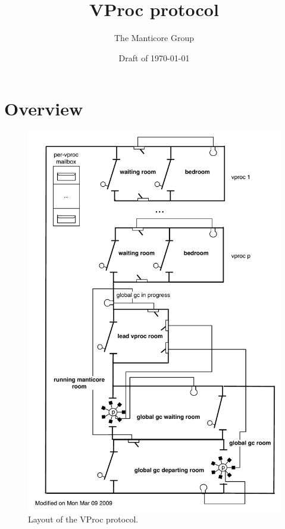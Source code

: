 \documentclass[11pt]{article}
\title{VProc protocol}
\author{The Manticore Group}
\date{Draft of \today}
\begin{document}
\maketitle

\section{Overview}

\begin{figure}[tp]
  \begin{center}
    \includegraphics[scale=0.7]{pictures/vproc-protocol}
  \end{center}%
  \caption{Layout of the VProc protocol.}
  \label{fig:vproc-protocol}
\end{figure}%
\end{document}
